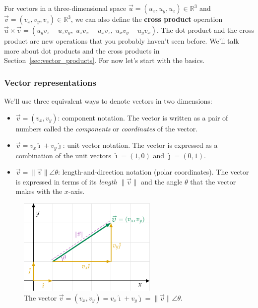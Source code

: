 			For vectors in a three-dimensional space $\vec{u}=(u_x,u_y,u_z) \in \mathbb{R}^3$
			and $\vec{v}=(v_x,v_y,v_z) \in \mathbb{R}^3$,
			we can also define the \textbf{cross product} operation												
			$\vec{u} \times \vec{v} = (u_yv_z-u_zv_y,\; u_zv_x-u_xv_z,\; u_xv_y-u_yv_x)$.
			The dot product and the cross product are new operations that you probably haven't seen before.
			We'll talk more about dot products and the cross products in Section~\ref{sec:vector_products}.
			For now let's start with the basics.


		\subsubsection{Vector representations}

			We'll use three equivalent ways to denote vectors in two dimensions:
			\begin{itemize}
			    \item   	$\vec{v} =(v_x, v_y)$: component notation.
					The vector is written as a pair of numbers called the \emph{components} or \emph{coordinates} of the vector.	
			    \item 	$\vec{v} =v_x\hat{\imath}+ v_y\hat{\jmath}$: unit vector notation.
					The vector is expressed as a combination of the unit vectors
					$\hat{\imath} = (1,0)$ and $ \hat{\jmath} = (0,1)$.
			    \item   	$\vec{v}=\|\vec{v}\|\angle \theta$: length-and-direction notation (polar coordinates).
					The vector is expressed in terms of its \emph{length} $\|\vec{v}\|$
					and the angle $\theta$ that the vector makes with the $x$-axis.
			\end{itemize}

			\begin{figure}[htb]
				\centering
				\includegraphics[width=0.6\textwidth]{figures/vectors/vector_components_annotated.pdf}
				\vspace{-2mm}
				\caption{The vector $\vec{v}=(v_x,v_y) = v_x\hat{\imath}+ v_y\hat{\jmath} = \|\vec{v}\|\angle \theta$.}
				\label{fig:vector_components_annotated}
			\end{figure}

